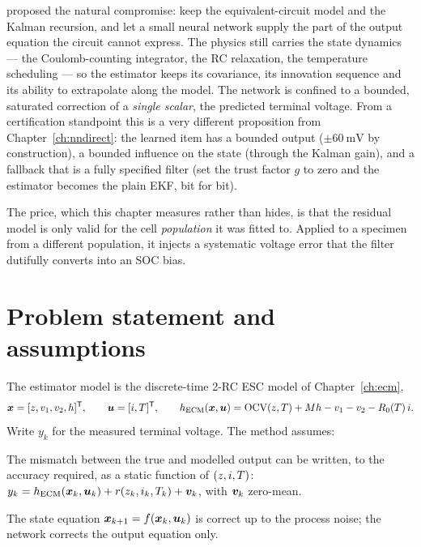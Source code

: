 \citet{charkhgard2010nnekf} proposed the natural compromise: keep the equivalent-circuit model and
the Kalman recursion, and let a small neural network supply the part of the output equation the
circuit cannot express.  The physics still carries the state dynamics --- the Coulomb-counting
integrator, the RC relaxation, the temperature scheduling --- so the estimator keeps its
covariance, its innovation sequence and its ability to extrapolate along the model.  The network
is confined to a bounded, saturated correction of a \emph{single scalar}, the predicted terminal
voltage.  From a certification standpoint this is a very different proposition from
Chapter~\ref{ch:nndirect}: the learned item has a bounded output ($\pm\SI{60}{\milli\volt}$ by
construction), a bounded influence on the state (through the Kalman gain), and a fallback that is
a fully specified filter (set the trust factor $g$ to zero and the estimator becomes the plain EKF,
bit for bit).

The price, which this chapter measures rather than hides, is that the residual model is only valid
for the cell \emph{population} it was fitted to.  Applied to a specimen from a different
population, it injects a systematic voltage error that the filter dutifully converts into an SOC
bias.

\section{Problem statement and assumptions}
The estimator model is the discrete-time 2-RC ESC model of Chapter~\ref{ch:ecm},
\begin{equation}\label{eq:nne-model}
\bm{x} = [z, v_1, v_2, h]^{\mathsf{T}},\qquad \bm{u} = [i, T]^{\mathsf{T}},\qquad
h_{\mathrm{ECM}}(\bm{x},\bm{u}) = \mathrm{OCV}(z,T) + M h - v_1 - v_2 - R_0(T)\, i .
\end{equation}
Write $y_k$ for the measured terminal voltage.  The method assumes:

\begin{assumption}\label{as:nne-sep}
The mismatch between the true and modelled output can be written, to the accuracy required, as a
static function of $(z, i, T)$:
$y_k = h_{\mathrm{ECM}}(\bm{x}_k,\bm{u}_k) + r(z_k, i_k, T_k) + \bm{v}_k$, with $\bm{v}_k$ zero-mean.
\end{assumption}

\begin{assumption}\label{as:nne-dyn}
The state equation $\bm{x}_{k+1} = f(\bm{x}_k,\bm{u}_k)$ is correct up to the process noise; the network
corrects the output equation only.
\end{assumption}

